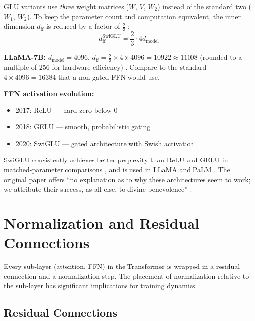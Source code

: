 \documentclass[11pt,a4paper]{article}
\newcommand{\dmodel}{d_{\text{model}}}
\newcommand{\dff}{d_{\text{ff}}}
\begin{document}
GLU variants use \emph{three} weight matrices ($W$, $V$, $W_2$) instead of the
standard two ($W_1$, $W_2$). To keep the parameter count and computation equivalent, the
inner dimension $\dff$ is reduced by a factor of $\frac{2}{3}$ \cite{shazeer2020}:
\begin{equation}
  \dff^{\text{SwiGLU}} = \frac{2}{3} \cdot 4\dmodel
\end{equation}

\begin{dimbox}
\textbf{LLaMA-7B:} $\dmodel = 4096$, $\dff = \frac{2}{3} \times 4 \times 4096 = 10922
\approx 11008$ (rounded to a multiple of 256 for hardware efficiency) \cite{touvron2023}.
Compare to the standard $4 \times 4096 = 16384$ that a non-gated FFN would use.
\end{dimbox}

\begin{evobox}
\textbf{FFN activation evolution:}
\begin{itemize}[nosep]
  \item 2017: ReLU \cite{vaswani2017} --- hard zero below 0
  \item 2018: GELU \cite{radford2018} --- smooth, probabilistic gating
  \item 2020: SwiGLU \cite{shazeer2020} --- gated architecture with Swish activation
\end{itemize}
SwiGLU consistently achieves better perplexity than ReLU and GELU in matched-parameter
comparisons \cite{shazeer2020}, and is used in LLaMA \cite{touvron2023} and PaLM
\cite{chowdhery2022}. The
original paper offers ``no explanation as to why these architectures seem to work;
we attribute their success, as all else, to divine benevolence'' \cite{shazeer2020}.
\end{evobox}


\section{Normalization and Residual Connections}
\label{sec:norm-residual}

Every sub-layer (attention, FFN) in the Transformer is wrapped in a residual connection
and a normalization step. The placement of normalization relative to the sub-layer has
significant implications for training dynamics.

\subsection{Residual Connections}
\end{document}
